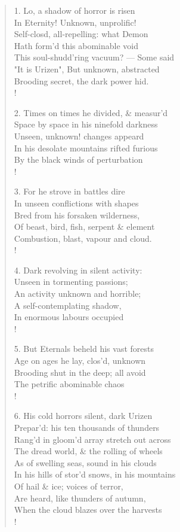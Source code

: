 \documentclass[9pt]{extarticle}
\begin{document}
\newpage
{}
	\begin{verse}
	\begin{altverse} 
		
		
		1. Lo, a shadow of horror is risen\\
		In Eternity! Unknown, unprolific!\\
		Self-closd, all-repelling: what Demon\\
		Hath form'd this abominable void\\
		This soul-shudd'ring vacuum? — Some said\\
		"It is Urizen", But unknown, abstracted\\
		Brooding secret, the dark power hid.\\!
		
		2. Times on times he divided, \& measur'd\\
		Space by space in his ninefold darkness\\
		Unseen, unknown! changes appeard\\
		In his desolate mountains rifted furious\\
		By the black winds of perturbation\\!
		
		3. For he strove in battles dire\\
		In unseen conflictions with shapes\\
		Bred from his forsaken wilderness,\\
		Of beast, bird, fish, serpent \& element\\
		Combustion, blast, vapour and cloud.\\!
		
		4. Dark revolving in silent activity:\\
		Unseen in tormenting passions;\\
		An activity unknown and horrible;\\
		A self-contemplating shadow,\\
		In enormous labours occupied\\!
		
		5. But Eternals beheld his vast forests\\
		Age on ages he lay, clos'd, unknown\\
		Brooding shut in the deep; all avoid\\
		The petrific abominable chaos\\!
		
		6. His cold horrors silent, dark Urizen\\
		Prepar'd: his ten thousands of thunders\\
		Rang'd in gloom'd array stretch out across\\
		The dread world, \& the rolling of wheels\\
		As of swelling seas, sound in his clouds\\
		In his hills of stor'd snows, in his mountains\\
		Of hail \& ice; voices of terror,\\
		Are heard, like thunders of autumn,\\
		When the cloud blazes over the harvests\\!


\end{altverse}
\end{verse}
\end{document}
